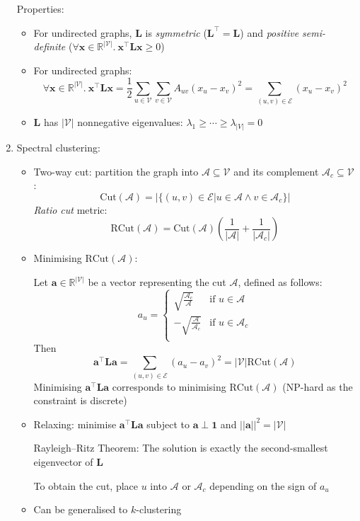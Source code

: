 \documentclass{article}
\begin{document}
\begin{enumerate}
	Properties:
	\begin{itemize}[topsep=0pt]
		\item For undirected graphs, $\mathbf{L}$ is \textit{symmetric} ($\mathbf{L}^\top=\mathbf{L}$) and \textit{positive semi-definite} ($\forall\mathbf{x}\in\mathbb{R}^{|\mathcal{V}|}.\ \mathbf{x}^\top\mathbf{L}\mathbf{x}\geq0$)
		\item For undirected graphs:
		$$\forall \mathbf{x}\in\mathbb{R}^{|\mathcal{V}|}.\ \mathbf{x}^\top\mathbf{L}\mathbf{x}=\frac{1}{2}\sum_{u\in\mathcal{V}}\sum_{v\in\mathcal{V}}A_{uv}(x_u-x_v)^2=\sum_{(u,v)\in\mathcal{E}}(x_u-x_v)^2$$
		\item $\mathbf{L}$ has $|\mathcal{V}|$ nonnegative eigenvalues: $\lambda_1\geq\cdots\geq\lambda_{|V|}=0$
	\end{itemize}
	\newpage
	\item Spectral clustering:
	\begin{itemize}[topsep=0pt]
		\item Two-way cut: partition the graph into $\mathcal{A}\subseteq\mathcal{V}$ and its complement $\mathcal{A}_c\subseteq\mathcal{V}$:
		$$\text{Cut}(\mathcal{A})=\left|\big\{(u, v)\in\mathcal{E}\big|u\in\mathcal{A}\wedge v\in\mathcal{A}_c\big\}\right|$$
		\textit{Ratio cut} metric:
		$$\text{RCut}(\mathcal{A})=\text{Cut}(\mathcal{A})\left(\frac{1}{|\mathcal{A}|}+\frac{1}{|\mathcal{A}_c|}\right)$$
		\item Minimising $\text{RCut}(\mathcal{A})$:
		
		Let $\mathbf{a}\in\mathbb{R}^{|\mathcal{V}|}$ be a vector representing the cut $\mathcal{A}$, defined as follows:
		$$a_u=\begin{cases}
			\sqrt{\frac{\mathcal{A}_c}{\mathcal{A}}} &\text{if }u\in\mathcal{A}\\
			-\sqrt{\frac{\mathcal{A}}{\mathcal{A}_c}} &\text{if }u\in\mathcal{A}_c\\
		\end{cases}$$
		Then
		$$\mathbf{a}^\top\mathbf{L}\mathbf{a}=\sum_{(u,v)\in\mathcal{E}}(a_u-a_v)^2=|\mathcal{V}|\text{RCut}(\mathcal{A})$$
		Minimising $\mathbf{a}^\top\mathbf{L}\mathbf{a}$ corresponds to minimising $\text{RCut}(\mathcal{A})$ (NP-hard as the constraint is discrete)
		\item Relaxing: minimise $\mathbf{a}^\top\mathbf{L}\mathbf{a}$ subject to $\mathbf{a}\perp\mathbf{1}$ and $||\mathbf{a}||^2=|\mathcal{V}|$
		
		Rayleigh--Ritz Theorem: The solution is exactly the second-smallest eigenvector of $\mathbf{L}$
		
		To obtain the cut, place $u$ into $\mathcal{A}$ or $\mathcal{A}_c$ depending on the sign of $a_u$
		\item Can be generalised to $k$-clustering 
	\end{itemize}
\end{enumerate}
\end{document}
